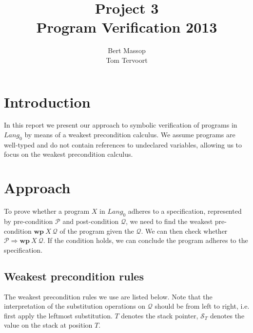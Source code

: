 \documentclass[a4paper]{article}
\title{Project 3\\\large\sc Program Verification 2013}
\author{Bert Massop\\Tom Tervoort}
\newcommand{\Q}{\mathcal{Q}}
\renewcommand{\P}{\mathcal{P}}
\renewcommand{\wp}{\mathbf{wp}}
\newcommand{\stack}[1]{\mathcal{S}_{#1}}
\begin{document}
\maketitle

\section{Introduction}
In this report we present our approach to symbolic verification of programs in $\mathit{Lang}_0$ by means of a weakest precondition calculus. We assume programs are well-typed and do not contain references to undeclared variables, allowing us to focus on the weakest precondition calculus.

\section{Approach}
To prove whether a program $X$ in $\mathit{Lang}_0$ adheres to a specification, represented by pre-condition $\P$ and post-condition $\Q$, we need to find the weakest pre-condition $\wp\ X\ \Q$ of the program given the $\Q$. We can then check whether $\P \Rightarrow \wp\ X\ \Q$. If the condition holds, we can conclude the program adheres to the specification.

\subsection{Weakest precondition rules}
The weakest precondition rules we use are listed below. Note that the interpretation of the substitution operations on $\Q$ should be from left to right, i.e. first apply the leftmost substitution. $T$ denotes the stack pointer, $\stack{T}$ denotes the value on the stack at position $T$.
\end{document}
